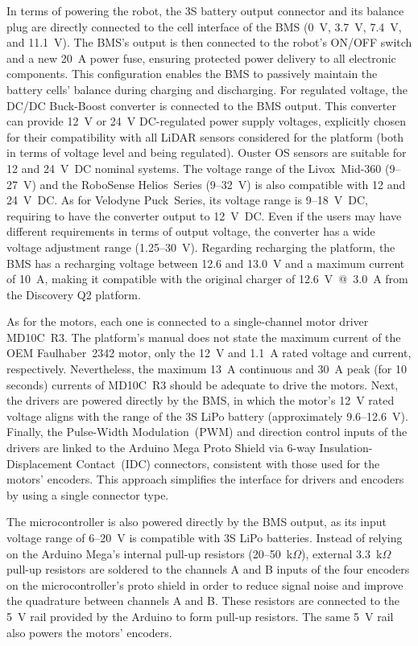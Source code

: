 \documentclass[letterpaper,10pt,conference]{IEEEtran} %
\begin{document}
In terms of powering the robot,
the 3S battery output connector and its balance plug are directly connected
to the cell interface of the BMS (0~V, 3.7~V, 7.4~V, and 11.1~V).
The BMS's output is then connected to the
robot's ON/OFF switch and a new 20~A power fuse,
ensuring protected power delivery to all electronic components.
This configuration enables the BMS to passively 
maintain the battery cells' balance
during charging and discharging.
For regulated voltage, the DC/DC Buck-Boost converter is connected to the 
BMS output. This converter can provide
12~V or 24~V DC-regulated power supply voltages,
explicitly chosen for their compatibility with
all LiDAR sensors considered for the platform
(both in terms of voltage level and being regulated).
Ouster OS sensors are suitable for 12 and 24~V~DC nominal systems.
The voltage range of the Livox~Mid-360 (9--27~V) and the
RoboSense Helios~Series (9--32~V) is also compatible with 12 and 24~V~DC.
As for Velodyne Puck~Series, its voltage range is
9--18~V~DC, requiring to have the converter output to 12~V~DC.
Even if the users may have different requirements in terms of output voltage,
the converter has a wide voltage adjustment range (1.25--30~V).
Regarding recharging the platform,
the BMS has a recharging voltage between 12.6 and 13.0~V
and a maximum current of 10~A,
making it compatible with the original charger of 12.6~V~@~3.0~A from the Discovery Q2 platform.

As for the motors, each one is connected to a
single-channel motor driver MD10C~R3.
The platform's manual does not state the maximum current of the OEM Faulhaber~2342 motor,
only the 12~V and 1.1~A rated voltage and current, respectively.
Nevertheless, the maximum 13~A continuous and 30~A peak 
(for 10 seconds) currents
of MD10C~R3 should be adequate to drive the motors.
Next, the drivers are powered directly by the BMS,
in which the motor's 12~V rated voltage aligns with the
range of the 3S LiPo battery (approximately 9.6--12.6~V).
Finally, the Pulse-Width Modulation~(PWM)
and direction control inputs of the drivers
are linked to the Arduino Mega Proto Shield via 6-way
Insulation-Displacement Contact~(IDC) connectors,
consistent with those used for the motors' encoders.
This approach simplifies the interface for 
drivers and encoders by using a single connector type.

The microcontroller is also powered directly by the BMS output,
as its input voltage range of 6--20~V is compatible
with 3S LiPo batteries.
Instead of relying on the Arduino Mega's internal pull-up resistors
(20--50~k$\Omega$), external 3.3~k$\Omega$ pull-up resistors are soldered to the
channels A and B inputs of the four encoders on the 
microcontroller's proto shield
in order to reduce signal noise and improve
the quadrature between channels A and B.
These resistors are connected to the 5~V rail provided by the 
Arduino to form pull-up resistors.
The same 5~V rail also powers the motors' encoders.
\end{document}
